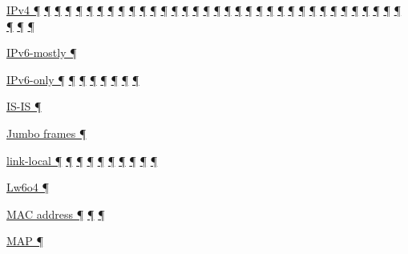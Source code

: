 \documentclass[
]{article}
\begin{document}
\hyperref[how-a-network-operations-center-sees-ipv6]{IPv4 ¶}
\hyperref[how-an-application-programmer-sees-ipv6]{¶}
\hyperref[why-version-6]{¶} \hyperref[obsolete-features-in-ipv6]{¶}
\hyperref[address-resolution]{¶} \hyperref[addresses]{¶}
\hyperref[dns]{¶} \hyperref[extension-headers-and-options]{¶}
\hyperref[layer-2-functions]{¶} \hyperref[managed-configuration]{¶}
\hyperref[routing]{¶}
\hyperref[source-and-destination-address-selection]{¶}
\hyperref[traffic-class-and-flow-label]{¶}
\hyperref[transport-protocols]{¶} \hyperref[further-reading]{¶}
\hyperref[coexistence-with-legacy-ipv4]{¶}
\hyperref[dual-stack-scenarios]{¶}
\hyperref[ipv6-primary-differences-from-ipv4]{¶}
\hyperref[obsolete-techniques]{¶}
\hyperref[translation-and-ipv4-as-a-service]{¶} \hyperref[tunnels]{¶}
\hyperref[security]{¶} \hyperref[filtering]{¶}
\hyperref[layer-2-considerations]{¶} \hyperref[topology-obfuscation]{¶}
\hyperref[network-design]{¶} \hyperref[address-planning]{¶}
\hyperref[address-and-prefix-management]{¶}
\hyperref[benchmarking-and-monitoring]{¶}
\hyperref[energy-consumption]{¶} \hyperref[multi-prefix-operation]{¶}
\hyperref[multihoming]{¶} \hyperref[packet-size-and-jumbo-frames]{¶}
\hyperref[cern-and-the-lhc]{¶} \hyperref[deployment-by-carriers]{¶}
\hyperref[deployment-in-the-home]{¶} \hyperref[status]{¶}
\hyperref[tools]{¶}

\hyperref[dual-stack-scenarios]{IPv6-mostly ¶}

\hyperref[routing]{IPv6-only ¶}
\hyperref[source-and-destination-address-selection]{¶}
\hyperref[coexistence-with-legacy-ipv4]{¶}
\hyperref[dual-stack-scenarios]{¶}
\hyperref[translation-and-ipv4-as-a-service]{¶} \hyperref[tunnels]{¶}
\hyperref[security]{¶} \hyperref[deployment-by-carriers]{¶}

\hyperref[routing]{IS-IS ¶}

\hyperref[packet-size-and-jumbo-frames]{Jumbo frames ¶}

\hyperref[address-resolution]{link-local ¶} \hyperref[addresses]{¶}
\hyperref[auto-configuration]{¶} \hyperref[dns]{¶}
\hyperref[source-and-destination-address-selection]{¶}
\hyperref[filtering]{¶} \hyperref[network-design]{¶}
\hyperref[energy-consumption]{¶} \hyperref[multi-prefix-operation]{¶}
\hyperref[deployment-in-the-home]{¶}

\hyperref[translation-and-ipv4-as-a-service]{Lw6o4 ¶}

\hyperref[address-resolution]{MAC address ¶} \hyperref[addresses]{¶}
\hyperref[address-and-prefix-management]{¶}

\hyperref[translation-and-ipv4-as-a-service]{MAP ¶}
\end{document}
